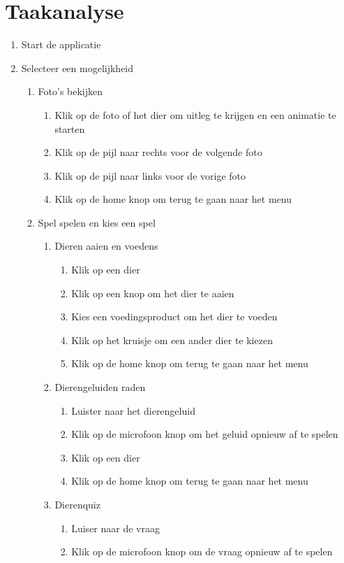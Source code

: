 \documentclass[12pt]{article}
\begin{document}
\section{Taakanalyse}
\begin{enumerate}
	\item Start de applicatie
	\item Selecteer een mogelijkheid
	\begin{enumerate}[(1)]
		\item Foto's bekijken
		\begin{enumerate}[1.]
			\item Klik op de foto of het dier om uitleg te krijgen en een animatie te starten
			\item Klik op de pijl naar rechts voor de volgende foto
			\item Klik op de pijl naar links voor de vorige foto
			\item Klik op de home knop om terug te gaan naar het menu
		\end{enumerate}
		\item Spel spelen en kies een spel
		\begin{enumerate}[1.]
			\item Dieren aaien en voedens
			\begin{enumerate}[(1)]
				\item Klik op een dier
				\item Klik op een knop om het dier te aaien
				\item Kies een voedingsproduct om het dier te voeden
				\item Klik op het kruisje om een ander dier te kiezen
				\item Klik op de home knop om terug te gaan naar het menu
			\end{enumerate}
			\item Dierengeluiden raden
			\begin{enumerate}[(1)]
				\item Luister naar het dierengeluid
				\item Klik op de microfoon knop om het geluid opnieuw af te spelen
				\item Klik op een dier
				\item Klik op de home knop om terug te gaan naar het menu
			\end{enumerate}
			\item Dierenquiz
			\begin{enumerate}[(1)]
				\item Luiser naar de vraag
				\item Klik op de microfoon knop om de vraag opnieuw af te spelen

\end{enumerate}
\end{enumerate}
\end{enumerate}
\end{enumerate}
\end{document}
